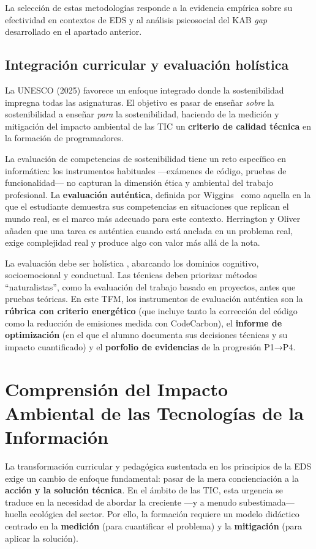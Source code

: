 La selección de estas metodologías responde a la evidencia empírica sobre su efectividad en contextos de EDS y al análisis psicosocial del KAB \textit{gap} desarrollado en el apartado anterior.


\subsection{Integración curricular y evaluación holística}


La UNESCO (2025) favorece un enfoque integrado donde la sostenibilidad impregna todas las asignaturas. El objetivo es pasar de enseñar \textit{sobre} la sostenibilidad a enseñar \textit{para} la sostenibilidad, haciendo de la medición y mitigación del impacto ambiental de las TIC un \textbf{criterio de calidad técnica} en la formación de programadores.


La evaluación de competencias de sostenibilidad tiene un reto específico en informática: los instrumentos habituales —exámenes de código, pruebas de funcionalidad— no capturan la dimensión ética y ambiental del trabajo profesional. La \textbf{evaluación auténtica}, definida por Wiggins~\cite{wiggins1990case} como aquella en la que el estudiante demuestra sus competencias en situaciones que replican el mundo real, es el marco más adecuado para este contexto. Herrington y Oliver~\cite{herrington2000instructional} añaden que una tarea es auténtica cuando está anclada en un problema real, exige complejidad real y produce algo con valor más allá de la nota.


La evaluación debe ser holística \cite{unesco2025guia}, abarcando los dominios cognitivo, socioemocional y conductual. Las técnicas deben priorizar métodos ``naturalistas'', como la evaluación del trabajo basado en proyectos, antes que pruebas teóricas. En este TFM, los instrumentos de evaluación auténtica son la \textbf{rúbrica con criterio energético} (que incluye tanto la corrección del código como la reducción de emisiones medida con CodeCarbon), el \textbf{informe de optimización} (en el que el alumno documenta sus decisiones técnicas y su impacto cuantificado) y el \textbf{porfolio de evidencias} de la progresión P1→P4.




\section{Comprensión del Impacto Ambiental de las Tecnologías de la Información}


La transformación curricular y pedagógica sustentada en los principios de la EDS exige un cambio de enfoque fundamental: pasar de la mera concienciación a la \textbf{acción y la solución técnica}. En el ámbito de las TIC, esta urgencia se traduce en la necesidad de abordar la creciente —y a menudo subestimada— huella ecológica del sector. Por ello, la formación requiere un modelo didáctico centrado en la \textbf{medición} (para cuantificar el problema) y la \textbf{mitigación} (para aplicar la solución).


